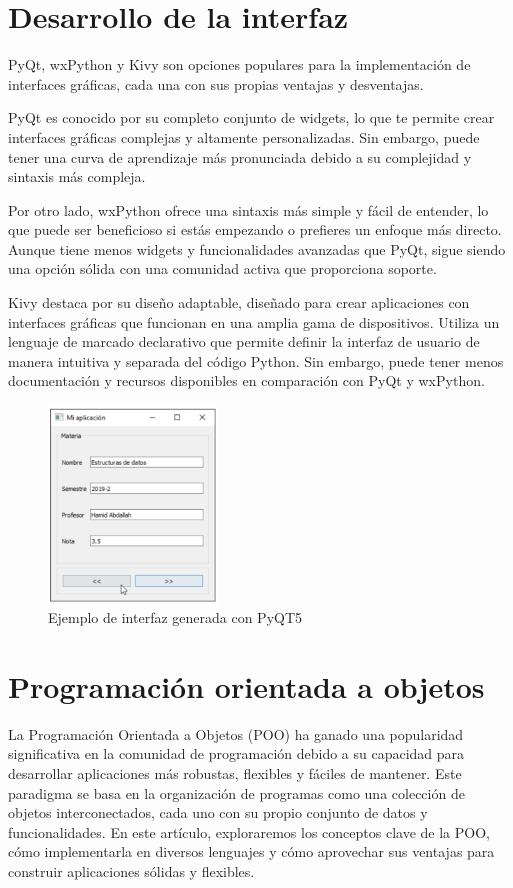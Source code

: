 \section{Desarrollo de la interfaz}
\label{sec:estudiointerfaz}
PyQt, wxPython y Kivy son opciones populares para la implementación de interfaces gráficas, cada una con sus propias ventajas y desventajas.

PyQt es conocido por su completo conjunto de widgets, lo que te permite crear interfaces gráficas complejas y altamente personalizadas. Sin embargo, puede tener una curva de aprendizaje más pronunciada debido a su complejidad y sintaxis más compleja.

Por otro lado, wxPython ofrece una sintaxis más simple y fácil de entender, lo que puede ser beneficioso si estás empezando o prefieres un enfoque más directo. Aunque tiene menos widgets y funcionalidades avanzadas que PyQt, sigue siendo una opción sólida con una comunidad activa que proporciona soporte.


Kivy destaca por su diseño adaptable, diseñado para crear aplicaciones con interfaces gráficas que funcionan en una amplia gama de dispositivos. Utiliza un lenguaje de marcado declarativo que permite definir la interfaz de usuario de manera intuitiva y separada del código Python. Sin embargo, puede tener menos documentación y recursos disponibles en comparación con PyQt y wxPython.

\begin{figure}[h]
	\centering
	\includegraphics[width=0.4\textwidth]{Imagenes/PyQT5_Interfaz}
	\caption{Ejemplo de interfaz generada con PyQT5}
	\label{fig:interfazPYQT5}
\end{figure}

\section{Programación orientada a objetos}
La Programación Orientada a Objetos (POO) ha ganado una popularidad significativa en la comunidad de programación debido a su capacidad para desarrollar aplicaciones más robustas, flexibles y fáciles de mantener. Este paradigma se basa en la organización de programas como una colección de objetos interconectados, cada uno con su propio conjunto de datos y funcionalidades. En este artículo, exploraremos los conceptos clave de la POO, cómo implementarla en diversos lenguajes y cómo aprovechar sus ventajas para construir aplicaciones sólidas y flexibles.

